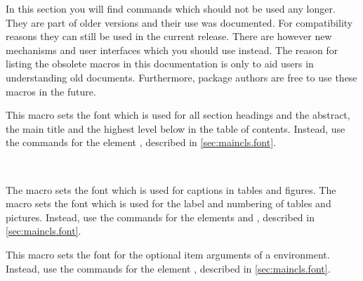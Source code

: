 \begin{Explain}
  In this section you will find commands which should not be used any
  longer. They are part of older {\KOMAScript} versions and their use
  was documented. For compatibility reasons they can still be used in
  the current {\KOMAScript} release. There are however new mechanisms
  and user interfaces which you should use instead. The reason for
  listing the obsolete macros in this documentation is only to aid
  users in understanding old documents.  Furthermore, package authors
  are free to use these macros in the future.

  \begin{Declaration}
  \end{Declaration}
  This macro sets the font which is used for all section headings and
  the abstract, the main title and the highest level below
   in the table of contents. Instead, use the commands for
  the element , described in
  \autoref{sec:maincls.font}.%

  \begin{Declaration}
     \\
  \end{Declaration}
  The macro  sets the font which is used for captions
  in tables and figures. The macro  sets the font
  which is used for the label and numbering of tables and pictures.
  Instead, use the commands for the elements  and
  , described in
  \autoref{sec:maincls.font}.%

  \begin{Declaration}
  \end{Declaration}
  This macro sets the font for the optional item arguments of a
   environment. Instead, use the commands for
  the element , described in 
  \autoref{sec:maincls.font}.%

\end{Explain}

